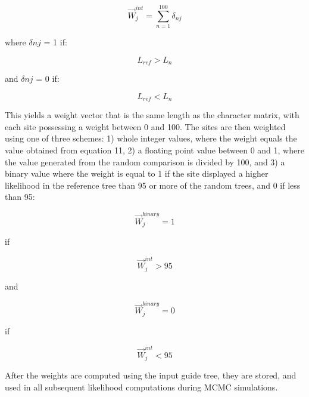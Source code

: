 \documentclass[12pt]{article}
\begin{document}
\begin{equation}
\overrightarrow{W}^{int}_j = \sum\limits_{n=1}^{100}\delta_{nj}
\end{equation}

where $\delta nj$ = 1 if:

\begin{equation}
L_{ref} > L_n 
\end{equation}

and $\delta nj$ = 0 if:

\begin{equation}
L_{ref} < L_n 
\end{equation}

This yields a weight vector that is the same length as the character
matrix, with each site possessing a weight between 0 and 100. The sites
are then weighted using one of three schemes: 1) whole integer values,
where the weight equals the value obtained from equation 11, 2) a
floating point value between 0 and 1, where the value generated from the
random comparison is divided by 100, and 3) a binary value where the
weight is equal to 1 if the site displayed a higher likelihood in the
reference tree than 95 or more of the random trees, and 0 if less than
95:

\begin{equation}
\overrightarrow{W}^{binary}_j = 1
\end{equation}

if 

\begin{equation}
\overrightarrow{W}^{int}_j > 95 
\end{equation}

and

\begin{equation}
\overrightarrow{W}^{binary}_j = 0
\end{equation}

if

\begin{equation}
\overrightarrow{W}^{int}_j <  95
\end{equation}

After the weights are computed using the input guide tree, they are stored, and used in all subsequent likelihood computations during MCMC simulations.
\end{document}
